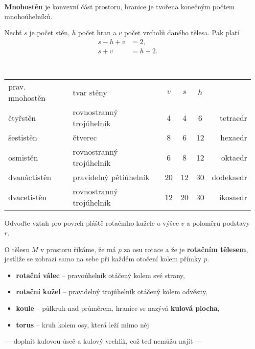 \begin{definition}
\textbf{Mnohostěn} je konvexní část prostoru, hranice je tvořena konečným počtem
mnohoúhelníků.
\end{definition}

\begin{veta}
    Nechť $s$ je počet stěn, $h$ počet hran a $v$ počet vrcholů daného tělesa. Pak
    platí
    \begin{align*}
        s-h+v &=2,\\
        s+v &=h+2.
    \end{align*}
\end{veta}

\begin{pozn}\,
\begin{center}
\begin{tabular}{l|l|c|c|c|r}
    prav. mnohostěn & tvar stěny & $v$ & $s$ & $h$ & \, \\
    čtyřstěn        & rovnostranný trojúhelník & 4 & 4&6 & tetraedr \\
    šestistěn       & čtverec & 8 & 6&12 & hexaedr \\
    osmistěn        & rovnostranný trojúhelník & 6 & 8&12 & oktaedr \\
    dvanáctistěn    & pravidelný pětiúhelník & 20 & 12&30 & dodekaedr \\
    dvacetistěn     & rovnostranný trojúhelník & 12 & 20&30 & ikosaedr \\
\end{tabular}
\end{center}

\end{pozn}

\begin{priklad}
Odvoďte vztah pro povrch pláště rotačního kužele o výšce $v$ a poloměru
podstavy $r$.
\end{priklad}

\begin{definition}
    O tělesu $M$ v prostoru říkáme, že má $p$ za osu rotace a že je \textbf{rotačním
    tělesem}, jestliže se zobrazí samo na sebe při každém otočení kolem přímky $p.$
\end{definition}

\begin{pozn}
\begin{itemize}
\item \textbf{rotační válec} -- pravoúhelník otáčený kolem své strany,
\item \textbf{rotační kužel} -- pravidelný trojúhelník otáčený kolem odvěsny,
\item \textbf{koule} -- půlkruh nad průměrem, hranice se nazývá \textbf{kulová plocha},
\item \textbf{torus} -- kruh kolem osy, která leží mimo něj
\end{itemize}
\end{pozn}

--- doplnit kulovou úseč a kulový vrchlík, což teď nemůžu najít ---
